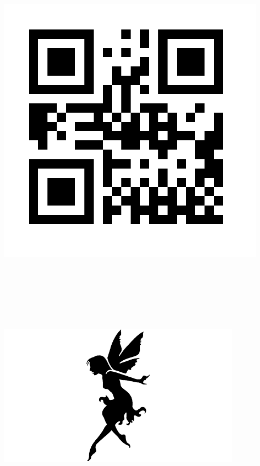 \documentclass{article}
\begin{document}
\pagestyle{empty}
\begin{center}
\includegraphics[height=20cm]{Fees}

\vspace{5mm}

\includegraphics[height=7cm]{Fee}
\end{center}
\end{document}
